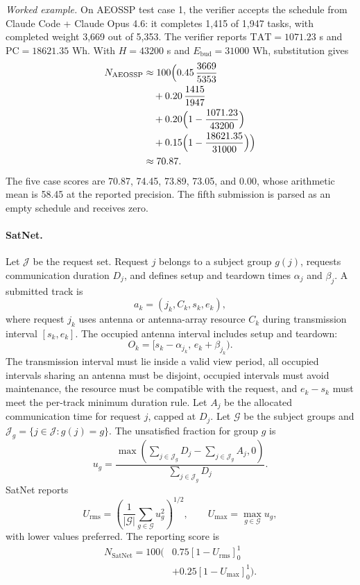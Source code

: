 \documentclass[]{mosi}
\begin{document}
\emph{Worked example.} On AEOSSP test case 1, the verifier accepts the schedule from Claude Code + Claude Opus 4.6: it completes 1,415 of 1,947 tasks, with completed weight 3,669 out of 5,353. The verifier reports \(\mathrm{TAT}=1071.23\) s and \(\mathrm{PC}=18621.35\) Wh. With \(H=43200\) s and \(E_{\mathrm{bud}}=31000\) Wh, substitution gives
\[
\begin{aligned}
N_{\mathrm{AEOSSP}}
&\approx 100\Bigl(0.45\,\frac{3669}{5353}\\
&\quad+0.20\,\frac{1415}{1947}\\
&\quad+0.20\Bigl(1-\frac{1071.23}{43200}\Bigr)\\
&\quad+0.15\Bigl(1-\frac{18621.35}{31000}\Bigr)\Bigr)\\
&\approx 70.87.
\end{aligned}
\]
The five case scores are 70.87, 74.45, 73.89, 73.05, and 0.00, whose arithmetic mean is 58.45 at the reported precision. The fifth submission is parsed as an empty schedule and receives zero.

\paragraph{SatNet.} Let \(\mathcal{J}\) be the request set. Request \(j\) belongs to a subject group \(g(j)\), requests communication duration \(D_j\), and defines setup and teardown times \(\alpha_j\) and \(\beta_j\). A submitted track is
\[
  a_k=(j_k,C_k,s_k,e_k),
\]
where request \(j_k\) uses antenna or antenna-array resource \(C_k\) during transmission interval \([s_k,e_k]\). The occupied antenna interval includes setup and teardown:
\[
  O_k=[s_k-\alpha_{j_k},\,e_k+\beta_{j_k}).
\]
The transmission interval must lie inside a valid view period, all occupied intervals sharing an antenna must be disjoint, occupied intervals must avoid maintenance, the resource must be compatible with the request, and \(e_k-s_k\) must meet the per-track minimum duration rule. Let \(A_j\) be the allocated communication time for request \(j\), capped at \(D_j\). Let \(\mathcal{G}\) be the subject groups and \(\mathcal{J}_g=\{j\in\mathcal{J}:g(j)=g\}\). The unsatisfied fraction for group \(g\) is
\[
  u_g=\frac{\max\left(\sum_{j\in\mathcal{J}_g}D_j-\sum_{j\in\mathcal{J}_g}A_j,0\right)}{\sum_{j\in\mathcal{J}_g}D_j}.
\]
SatNet reports
\[
  U_{\mathrm{rms}}=\left(\frac{1}{|\mathcal{G}|}\sum_{g\in\mathcal{G}}u_g^2\right)^{1/2},\qquad
  U_{\max}=\max_{g\in\mathcal{G}}u_g,
\]
with lower values preferred. The reporting score is
\[
  \begin{aligned}
  N_{\mathrm{SatNet}}=100(&0.75[1-U_{\mathrm{rms}}]_0^1\\
  &+0.25[1-U_{\max}]_0^1).
  \end{aligned}
\]
\end{document}
